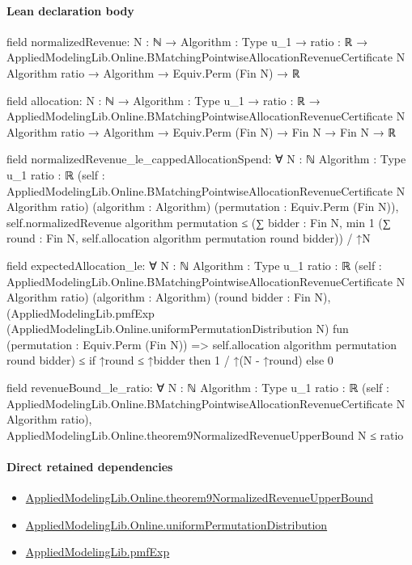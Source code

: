 \documentclass[10pt]{article}
\begin{document}
\paragraph{Lean declaration body}
\begin{ReviewVerbatim}
field normalizedRevenue:
{N : ℕ} →
  {Algorithm : Type u_1} →
    {ratio : ℝ} →
      AppliedModelingLib.Online.BMatchingPointwiseAllocationRevenueCertificate N Algorithm ratio →
        Algorithm → Equiv.Perm (Fin N) → ℝ

field allocation:
{N : ℕ} →
  {Algorithm : Type u_1} →
    {ratio : ℝ} →
      AppliedModelingLib.Online.BMatchingPointwiseAllocationRevenueCertificate N Algorithm ratio →
        Algorithm → Equiv.Perm (Fin N) → Fin N → Fin N → ℝ

field normalizedRevenue_le_cappedAllocationSpend:
∀ {N : ℕ} {Algorithm : Type u_1} {ratio : ℝ}
  (self : AppliedModelingLib.Online.BMatchingPointwiseAllocationRevenueCertificate N Algorithm ratio)
  (algorithm : Algorithm) (permutation : Equiv.Perm (Fin N)),
  self.normalizedRevenue algorithm permutation ≤
    (∑ bidder : Fin N, min 1 (∑ round : Fin N, self.allocation algorithm permutation round bidder)) / ↑N

field expectedAllocation_le:
∀ {N : ℕ} {Algorithm : Type u_1} {ratio : ℝ}
  (self : AppliedModelingLib.Online.BMatchingPointwiseAllocationRevenueCertificate N Algorithm ratio)
  (algorithm : Algorithm) (round bidder : Fin N),
  (AppliedModelingLib.pmfExp (AppliedModelingLib.Online.uniformPermutationDistribution N)
      fun (permutation : Equiv.Perm (Fin N)) => self.allocation algorithm permutation round bidder) ≤
    if ↑round ≤ ↑bidder then 1 / ↑(N - ↑round) else 0

field revenueBound_le_ratio:
∀ {N : ℕ} {Algorithm : Type u_1} {ratio : ℝ}
  (self : AppliedModelingLib.Online.BMatchingPointwiseAllocationRevenueCertificate N Algorithm ratio),
  AppliedModelingLib.Online.theorem9NormalizedRevenueUpperBound N ≤ ratio
\end{ReviewVerbatim}

\paragraph{Direct retained dependencies}
\begin{itemize}\raggedright
\item \hyperlink{governing-declaration-6c856b60345ac99f}{Applied\allowbreak{}Modeling\allowbreak{}Lib.\allowbreak{}Online.\allowbreak{}theorem9\allowbreak{}Normalized\allowbreak{}Revenue\allowbreak{}Upper\allowbreak{}Bound}
\item \hyperlink{governing-declaration-c18ea041e6faea64}{Applied\allowbreak{}Modeling\allowbreak{}Lib.\allowbreak{}Online.\allowbreak{}uniform\allowbreak{}Permutation\allowbreak{}Distribution}
\item \hyperlink{governing-declaration-8e4b4389a4f6454b}{Applied\allowbreak{}Modeling\allowbreak{}Lib.\allowbreak{}pmf\allowbreak{}Exp}
\end{itemize}
\hypertarget{governing-declaration-ff95aa44af6615ac}{}
\end{document}
